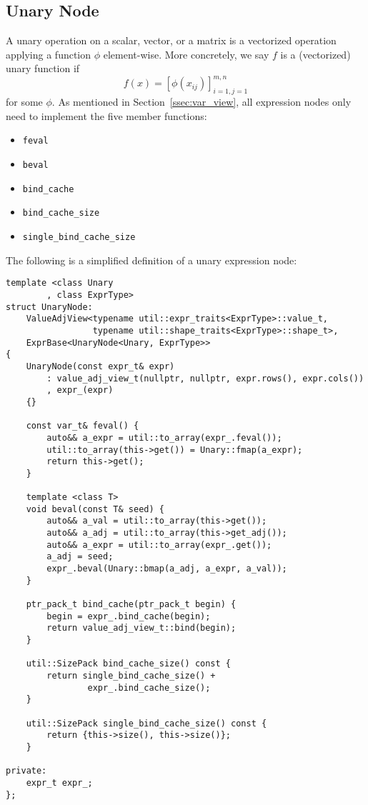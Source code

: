 \subsection{Unary Node}\label{ssec:unary}

A unary operation on a scalar, vector, or a matrix is a vectorized 
operation applying a function $\phi$ element-wise.
More concretely, we say $f$ is a (vectorized) unary function if
\[
    f(x) = {[\phi(x_{ij})]}_{i=1,j=1}^{m,n}
\]
for some $\phi$.
As mentioned in Section~\ref{ssec:var_view},
all expression nodes only need to
implement the five member functions: 
\begin{itemize}
    \item \verb|feval|
    \item \verb|beval|
    \item \verb|bind_cache|
    \item \verb|bind_cache_size|
    \item \verb|single_bind_cache_size|
\end{itemize}
The following is a simplified definition of a unary expression node:
\begin{lstlisting}[style=customcpp]
template <class Unary
        , class ExprType>
struct UnaryNode:
    ValueAdjView<typename util::expr_traits<ExprType>::value_t,
                 typename util::shape_traits<ExprType>::shape_t>,
    ExprBase<UnaryNode<Unary, ExprType>>
{
    UnaryNode(const expr_t& expr)
        : value_adj_view_t(nullptr, nullptr, expr.rows(), expr.cols())
        , expr_(expr)
    {}

    const var_t& feval() {
        auto&& a_expr = util::to_array(expr_.feval());
        util::to_array(this->get()) = Unary::fmap(a_expr);
        return this->get();
    }

    template <class T>
    void beval(const T& seed) {
        auto&& a_val = util::to_array(this->get());
        auto&& a_adj = util::to_array(this->get_adj());
        auto&& a_expr = util::to_array(expr_.get());
        a_adj = seed;
        expr_.beval(Unary::bmap(a_adj, a_expr, a_val));
    }

    ptr_pack_t bind_cache(ptr_pack_t begin) { 
        begin = expr_.bind_cache(begin);
        return value_adj_view_t::bind(begin);
    }

    util::SizePack bind_cache_size() const { 
        return single_bind_cache_size() + 
                expr_.bind_cache_size();
    }

    util::SizePack single_bind_cache_size() const {
        return {this->size(), this->size()};
    }

private:
    expr_t expr_;
};
\end{lstlisting}

